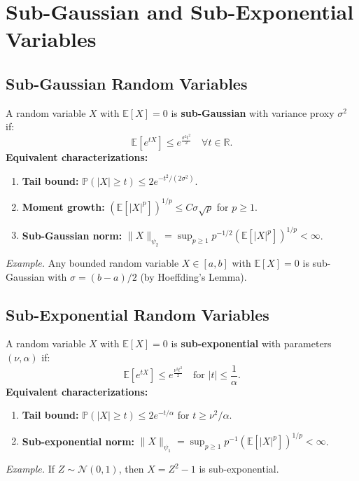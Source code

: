 \documentclass[11pt]{article}
\begin{document}
\hrulefill

\section{Sub-Gaussian and Sub-Exponential Variables}

\subsection{Sub-Gaussian Random Variables}
A random variable \(X\) with \(\mathbb{E}[X]=0\) is \textbf{sub-Gaussian} with variance proxy \(\sigma^2\) if:
\[
 \mathbb{E}[e^{tX}] \le e^{\frac{\sigma^2 t^2}{2}} \quad \forall t \in \mathbb{R}. 
\]
\textbf{Equivalent characterizations:}
\begin{enumerate}
    \item \textbf{Tail bound:} \(\mathbb{P}(|X| \ge t) \le 2e^{-t^2/(2\sigma^2)}\).
    \item \textbf{Moment growth:} \((\mathbb{E}[|X|^p])^{1/p} \le C\sigma \sqrt{p}\) for \(p \ge 1\).
    \item \textbf{Sub-Gaussian norm:} \(\|X\|_{\psi_2} = \sup_{p \ge 1} p^{-1/2} (\mathbb{E}[|X|^p])^{1/p} < \infty\).
\end{enumerate}

\emph{Example.} Any bounded random variable \(X \in [a,b]\) with \(\mathbb{E}[X]=0\) is sub-Gaussian with \(\sigma = (b-a)/2\) (by Hoeffding's Lemma).

\subsection{Sub-Exponential Random Variables}
A random variable \(X\) with \(\mathbb{E}[X]=0\) is \textbf{sub-exponential} with parameters \((\nu, \alpha)\) if:
\[
 \mathbb{E}[e^{tX}] \le e^{\frac{\nu^2 t^2}{2}} \quad \text{for } |t| \le \frac{1}{\alpha}. 
\]
\textbf{Equivalent characterizations:}
\begin{enumerate}
    \item \textbf{Tail bound:} \(\mathbb{P}(|X| \ge t) \le 2e^{-t/\alpha}\) for \(t \ge \nu^2/\alpha\).
    \item \textbf{Sub-exponential norm:} \(\|X\|_{\psi_1} = \sup_{p \ge 1} p^{-1} (\mathbb{E}[|X|^p])^{1/p} < \infty\).
\end{enumerate}

\emph{Example.} If \(Z \sim \mathcal{N}(0,1)\), then \(X = Z^2 - 1\) is sub-exponential.

\hrulefill
\end{document}
